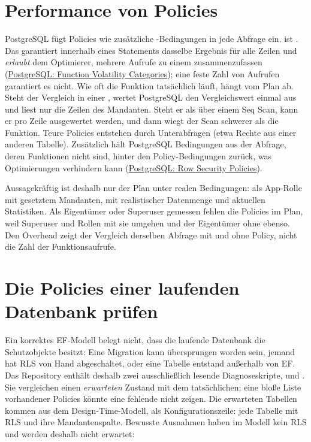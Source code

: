 \section{Performance von Policies}

PostgreSQL fügt Policies wie zusätzliche -Bedingungen in jede Abfrage ein.
 ist . Das garantiert innerhalb eines
Statements dasselbe Ergebnis für alle Zeilen und \emph{erlaubt} dem Optimierer, mehrere
Aufrufe zu einem zusammenzufassen
(\href{https://www.postgresql.org/docs/17/xfunc-volatility.html}{PostgreSQL: Function Volatility Categories}); eine
feste Zahl von Aufrufen garantiert es nicht. Wie oft die Funktion tatsächlich läuft, hängt
vom Plan ab. Steht der Vergleich in einer , wertet PostgreSQL den
Vergleichswert einmal aus und liest nur die Zeilen des Mandanten. Steht er als
 über einem Seq Scan, kann er pro Zeile ausgewertet werden, und dann wiegt
der Scan schwerer als die Funktion. Teure Policies entstehen durch Unterabfragen (etwa
Rechte aus einer anderen Tabelle). Zusätzlich hält PostgreSQL Bedingungen aus der Abfrage,
deren Funktionen nicht  sind, hinter den Policy-Bedingungen zurück, was
Optimierungen verhindern kann (\href{https://www.postgresql.org/docs/17/ddl-rowsecurity.html}{PostgreSQL: Row Security Policies}).

Aussagekräftig ist deshalb nur der Plan unter realen Bedingungen:  als App-Rolle mit gesetztem Mandanten, mit
realistischer Datenmenge und aktuellen Statistiken. Als Eigentümer oder Superuser gemessen fehlen
die Policies im Plan, weil Superuser und Rollen mit  sie umgehen und der
Eigentümer ohne  ebenso. Den Overhead zeigt der Vergleich derselben Abfrage mit
und ohne Policy, nicht die Zahl der Funktionsaufrufe.

\section{Die Policies einer laufenden Datenbank prüfen}\label{sec:policy-diagnosis}

Ein korrektes EF-Modell belegt nicht, dass die laufende Datenbank die Schutzobjekte besitzt: Eine
Migration kann übersprungen worden sein, jemand hat RLS von Hand abgeschaltet, oder eine Tabelle
entstand außerhalb von EF. Das Repository enthält deshalb zwei ausschließlich lesende
Diagnoseskripte,
und . Sie vergleichen
einen \emph{erwarteten} Zustand mit dem tatsächlichen; eine bloße Liste vorhandener Policies
könnte eine fehlende nicht zeigen. Die erwarteten Tabellen kommen aus dem Design-Time-Modell,
als Konfigurationszeile: jede Tabelle mit RLS und ihre Mandantenspalte. Bewusste Ausnahmen haben
im Modell kein RLS und werden deshalb nicht erwartet:

